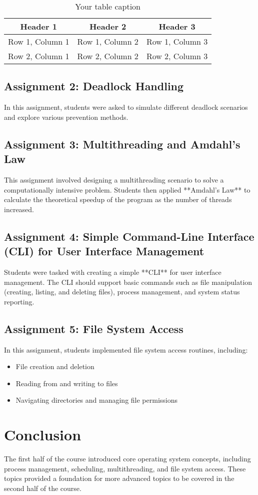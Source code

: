 \documentclass[12pt]{article}
\begin{document}
\begin{table}[htbp] %
    \centering
    \begin{tabular}{|c|c|c|} %
    \hline
    Header 1 & Header 2 & Header 3 \\ %
    \hline
    Row 1, Column 1 & Row 1, Column 2 & Row 1, Column 3 \\ %
    \hline
    Row 2, Column 1 & Row 2, Column 2 & Row 2, Column 3 \\ %
    \hline
    \end{tabular}
    \caption{Your table caption} %
    \label{tab:your_label} %
\end{table}

\subsection{Assignment 2: Deadlock Handling}
In this assignment, students were asked to simulate different deadlock scenarios and explore various prevention methods.

\subsection{Assignment 3: Multithreading and Amdahl's Law}
This assignment involved designing a multithreading scenario to solve a computationally intensive problem. Students then applied **Amdahl's Law** to calculate the theoretical speedup of the program as the number of threads increased.

\subsection{Assignment 4: Simple Command-Line Interface (CLI) for User Interface Management}
Students were tasked with creating a simple **CLI** for user interface management. The CLI should support basic commands such as file manipulation (creating, listing, and deleting files), process management, and system status reporting.

\subsection{Assignment 5: File System Access}
In this assignment, students implemented file system access routines, including:
\begin{itemize}
    \item File creation and deletion
    \item Reading from and writing to files
    \item Navigating directories and managing file permissions
\end{itemize}

\section{Conclusion}
The first half of the course introduced core operating system concepts, including process management, scheduling, multithreading, and file system access. These topics provided a foundation for more advanced topics to be covered in the second half of the course.
\end{document}
